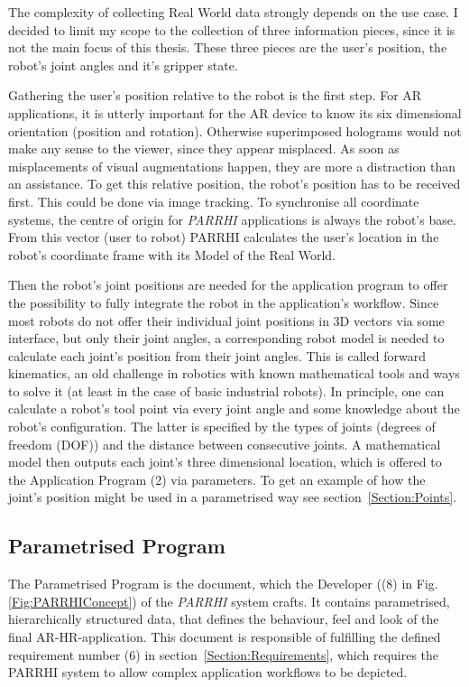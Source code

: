 The complexity of collecting Real World data strongly depends on the use case. I decided to limit my scope to the collection of three information pieces, since it is not the main focus of this thesis. These three pieces are the user's position, the robot's joint angles and it's gripper state. 

Gathering the user's position relative to the robot is the first step. For AR applications, it is utterly important for the AR device to know its six dimensional orientation (position and rotation). Otherwise superimposed holograms would not make any sense to the viewer, since they appear misplaced. As soon as misplacements of visual augmentations happen, they are more a distraction than an assistance. To get this relative position, the robot's position has to be received first. This could be done via image tracking. To synchronise all coordinate systems, the centre of origin for \textit{PARRHI} applications is always the robot's base. From this vector (user to robot) PARRHI calculates the user's location in the robot's coordinate frame with its Model of the Real World.

Then the robot's joint positions are needed for the application program to offer the possibility to fully integrate the robot in the application's workflow. Since most robots do not offer their individual joint positions in 3D vectors via some interface, but only their joint angles, a corresponding robot model is needed to calculate each joint's position from their joint angles. This is called forward kinematics, an old challenge in robotics with known mathematical tools and ways to solve it (at least in the case of basic industrial robots). In principle, one can calculate a robot's tool point via every joint angle and some knowledge about the robot's configuration. The latter is specified by the types of joints (degrees of freedom (DOF)) and the distance between consecutive joints. A mathematical model then outputs each joint's three dimensional location, which is offered to the Application Program (2) via parameters. To get an example of how the joint's position might be used in a parametrised way see section~\ref{Section:Points}.

\subsection{Parametrised Program}
\label{Section:ParametrisedProgram}
The Parametrised Program is the document, which the Developer ((8) in Fig. \ref{Fig:PARRHIConcept}) of the \textit{PARRHI} system crafts. It contains parametrised, hierarchically structured data, that defines the behaviour, feel and look of the final AR-HR-application. This document is responsible of fulfilling the defined requirement number (6) in section~\ref{Section:Requirements}, which requires the PARRHI system to allow complex application workflows to be depicted.

